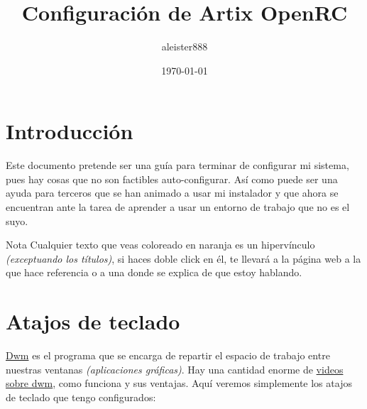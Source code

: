 \documentclass[12pt]{article}
\title{\textcolor{myorange}{\bfseries Configuración de Artix OpenRC}} %
\date{\today} %
\author{aleister888}
\begin{document}
\maketitle

\section{Introducción}

Este documento pretende ser una guía para terminar de configurar mi sistema, pues hay cosas que no son factibles auto-configurar. Así como puede ser una ayuda para terceros que se han animado a usar mi instalador y que ahora se encuentran ante la tarea de aprender a usar un entorno de trabajo que no es el suyo.

\begin{mybox}{Nota}
Cualquier texto que veas coloreado en naranja es un hipervínculo \emph{(exceptuando los títulos)}, si haces doble click en él, te llevará a la página web a la que hace referencia o a una donde se explica de que estoy hablando.
\end{mybox}

\section{Atajos de teclado}

\href{https://dwm.suckless.org}{Dwm} es el programa que se encarga de repartir el espacio de trabajo entre nuestras ventanas \emph{(aplicaciones gráficas)}. Hay una cantidad enorme de \href{https://www.youtube.com/results?search_query=dwm}{videos sobre dwm}, como funciona y sus ventajas. Aquí veremos simplemente los atajos de teclado que tengo configurados:
\end{document}
